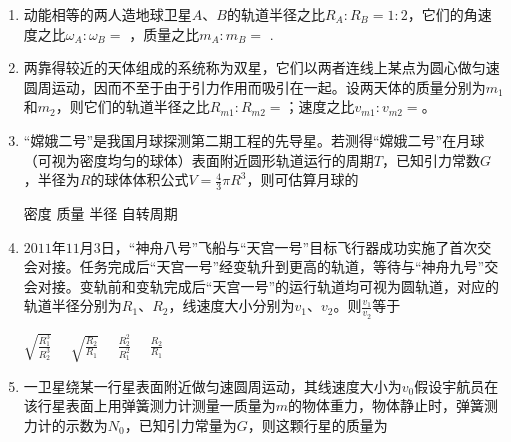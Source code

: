 
\begin{enumerate}[leftmargin=0em]
\renewcommand{\labelenumi}{\arabic{enumi}.}
\item
{}
动能相等的两人造地球卫星$ A $、$ B $的轨道半径之比$ R_A : R_B= 1 : 2 $，它们的角速度之比$ \omega _A : \omega _B= $  ，质量之比$ m_{A} : m_{B} = $  .



\item 
{}
两靠得较近的天体组成的系统称为双星，它们以两者连线上某点为圆心做匀速圆周运动，因而不至于由于引力作用而吸引在一起。设两天体的质量分别为$ m_{1} $和$ m_{2} $，则它们的轨道半径之比$ R _{m1} : R _{m2} = $；速度之比$ v _{m1} : v _{m2} = $。

\item 
{}
“嫦娥二号”是我国月球探测第二期工程的先导星。若测得“嫦娥二号”在月球（可视为密度均匀的球体）表面附近圆形轨道运行的周期$ T $，已知引力常数$ G $，半径为$ R $的球体体积公式$V = \frac { 4 } { 3 } \pi R ^ { 3 }$，则可估算月球的  

\fourchoices
{密度 }
{质量}
{半径 }
{自转周期}



\item 
{}
$ 2011 $年$ 11 $月$ 3 $日，“神舟八号”飞船与“天宫一号”目标飞行器成功实施了首次交会对接。任务完成后“天宫一号”经变轨升到更高的轨道，等待与“神舟九号”交会对接。变轨前和变轨完成后“天宫一号”的运行轨道均可视为圆轨道，对应的轨道半径分别为$ R_{1} $、$ R_{2} $，线速度大小分别为$ v_{1} $、$ v_{2} $。则$\frac { v _ { 1 } } { v _ { 2 } }$等于  

\fourchoices
{$\sqrt { \frac { R _ { 1 } ^ { 3 } } { R _ { 2 } ^ { 3 } } } \quad$}
{$\sqrt { \frac { R _ { 2 } } { R _ { 1 } } } \quad$}
{$\frac { R _ { 2 } ^ { 2 } } { R _ { 1 } ^ { 2 } } \quad$}
{$\frac { R _ { 2 } } { R _ { 1 } }$}



\item 
{}
一卫星绕某一行星表面附近做匀速圆周运动，其线速度大小为$ v_{0} $假设宇航员在该行星表面上用弹簧测力计测量一质量为$ m $的物体重力，物体静止时，弹簧测力计的示数为$ N_{0} $，已知引力常量为$ G $，则这颗行星的质量为  


\end{enumerate}
